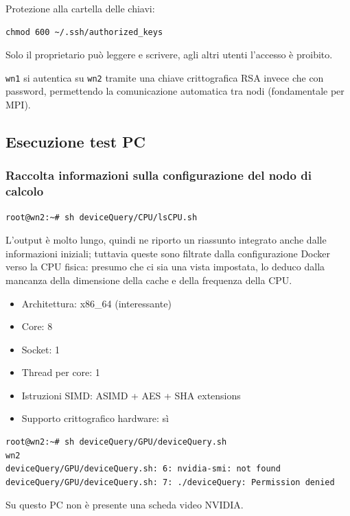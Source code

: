 \documentclass[11pt,a4paper]{article}
\begin{document}
Protezione alla cartella delle chiavi:
\begin{lstlisting}
chmod 600 ~/.ssh/authorized_keys
\end{lstlisting}
Solo il proprietario può leggere e scrivere, agli altri utenti l'accesso è proibito.

\texttt{wn1} si autentica su \texttt{wn2} tramite una chiave crittografica RSA invece che con password, permettendo la comunicazione automatica tra nodi (fondamentale per MPI).

\subsection{Esecuzione test PC}

\subsubsection{Raccolta informazioni sulla configurazione del nodo di calcolo}

\begin{lstlisting}
root@wn2:~# sh deviceQuery/CPU/lsCPU.sh
\end{lstlisting}

L'output è molto lungo, quindi ne riporto un riassunto integrato anche dalle informazioni iniziali; tuttavia queste sono filtrate dalla configurazione Docker verso la CPU fisica: presumo che ci sia una vista impostata, lo deduco dalla mancanza della dimensione della cache e della frequenza della CPU.

\begin{itemize}
    \item Architettura: x86\_64 (interessante)
    \item Core: 8
    \item Socket: 1
    \item Thread per core: 1
    \item Istruzioni SIMD: ASIMD + AES + SHA extensions
    \item Supporto crittografico hardware: sì
\end{itemize}

\begin{lstlisting}
root@wn2:~# sh deviceQuery/GPU/deviceQuery.sh
wn2
deviceQuery/GPU/deviceQuery.sh: 6: nvidia-smi: not found
deviceQuery/GPU/deviceQuery.sh: 7: ./deviceQuery: Permission denied
\end{lstlisting}

Su questo PC non è presente una scheda video NVIDIA.
\end{document}
